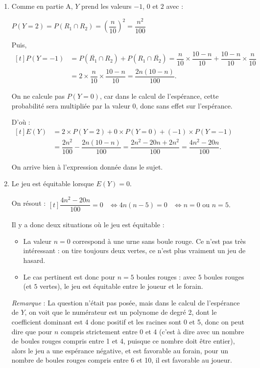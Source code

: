 \documentclass[10pt]{article}
\begin{document}
	\begin{enumerate}
		\item Comme en partie A, $Y$ prend les valeurs $-1$, $0$ et $2$ avec :

		$P(Y=2)=P(R_1\cap R_2)=\left(\dfrac{n}{10}\right)^{2}=\dfrac{n^{2}}{100}$

		Puis,\quad $\begin{aligned}[t]
			P(Y=-1)&=P\left(\overline{R_1} \cap R_2\right) + P\left(R_1 \cap \overline{R_2}\right) =\dfrac{n}{10}\times\dfrac{10-n}{10} + \dfrac{10-n}{10}\times\dfrac{n}{10}\\
			&=2\times\dfrac{n}{10}\times\dfrac{10-n}{10}=\dfrac{2n(10-n)}{100}.
		\end{aligned}$

		On ne calcule pas $P(Y = 0)$, car dans le calcul de l'espérance, cette probabilité sera multipliée par la valeur 0, donc sans effet sur l'espérance.

		D'où :\quad $\begin{aligned}[t]
			E(Y)&=2\times P(Y=2)+0\times P(Y=0)+(-1)\times P(Y=-1)\\
			&=\dfrac{2n^{2}}{100}-\dfrac{2n(10-n)}{100}
			=\dfrac{2n^{2}-20n+2n^{2}}{100}
			=\dfrac{4n^{2}-20n}{100}.
		\end{aligned}$

		On arrive bien à l'expression donnée dans le sujet.

		\item Le jeu est équitable lorsque $E(Y)=0$.

		On résout :\quad $\begin{aligned}[t]
			\dfrac{4n^{2}-20n}{100}=0
			&\iff 4n(n-5)=0
			&\iff n=0 \text{ ou } n=5.
		\end{aligned}$

		Il y a donc deux situations où le jeu est équitable :
		\begin{itemize}[left=5mm,label={\textbullet~}]
			\item La valeur $n=0$ correspond à une urne sans boule rouge. Ce n'est pas très intéressant : on tire toujours deux vertes, ce n'est plus vraiment un jeu de hasard.

			\item Le cas pertinent est donc pour $n=5$ boules rouges : avec $5$ boules rouges (et $5$ vertes), le jeu est équitable entre le joueur et le forain.
		\end{itemize}

		\emph{Remarque }: La question n'était pas posée, mais dans le calcul de l'espérance de $Y$, on voit que le numérateur est un polynome de degré 2, dont le coefficient dominant est 4 donc positif et les racines sont 0 et 5, donc on peut dire que pour $n$ compris strictement entre 0 et 4 (c'est à dire avec un nombre de boules rouges compris entre 1 et 4, puisque ce nombre doit être entier), alors le jeu a une espérance négative, et est favorable au forain, pour un nombre de boules rouges compris entre 6 et 10, il est favorable au joueur.
	\end{enumerate}
\end{document}
